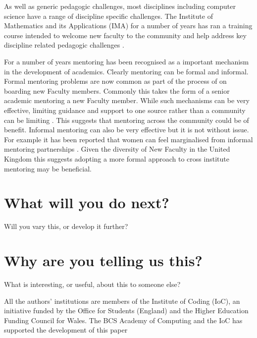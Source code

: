 \documentclass[sigconf]{acmart}
\begin{document}
As well as generic pedagogic challenges, most disciplines including computer science have a range of discipline specific challenges. The Institute of Mathematics and its Applications (IMA) for a number of years has ran a training course intended to welcome new faculty to the community and help address key discipline related pedagogic challenges \cite{IMA}.

For a number of years  mentoring has been recognised as a important mechanism in the development of academics. Clearly mentoring can be formal and informal. Formal mentoring problems are now common as part of the process of on boarding new Faculty members.  Commonly this takes the form of a senior academic mentoring a new Faculty member. While such mechanisms can be very effective, limiting guidance and support to one source rather than a community can be limiting \cite{deJanasz}. This suggests that mentoring across the community could be of benefit.  Informal mentoring can also be very effective but it is not without issue. For example it has been reported that women can feel marginalised from informal mentoring partnerships \cite{gibson2006mentoring}.  Given the diversity of New Faculty in the United Kingdom this suggests adopting a more formal approach to cross institute mentoring may be beneficial. 


\section{What will you do next?}
Will you vary this, or develop it further?
\section{Why are you telling us this?}	
What is interesting, or useful, about this to someone else?



\begin{acks}
 
  All the authors' institutions are members of the Institute of Coding (IoC), an initiative funded by the Office for Students (England) and the Higher Education Funding Council for Wales. The BCS Academy of Computing and the IoC has supported the development of this paper
 

\end{acks}





\balance
\end{document}

